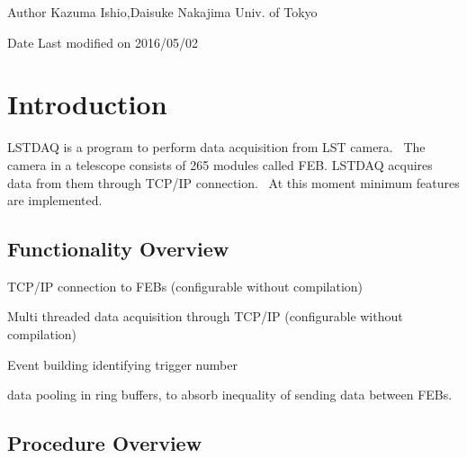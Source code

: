 \begin{DoxyAuthor}{Author}
Kazuma Ishio,Daisuke Nakajima Univ. of Tokyo 
\end{DoxyAuthor}
\begin{DoxyDate}{Date}
Last modified on 2016/05/02
\end{DoxyDate}
\hypertarget{index_INTRO}{}\section{Introduction}\label{index_INTRO}
L\+S\+T\+D\+AQ is a program to perform data acquisition from L\+ST camera.~\newline
 The camera in a telescope consists of 265 modules called F\+EB. L\+S\+T\+D\+AQ acquires data from them through T\+C\+P/\+IP connection.~\newline
 At this moment minimum features are implemented.\hypertarget{index_FUNCTIONALITY_OVERVIEW}{}\subsection{Functionality Overview}\label{index_FUNCTIONALITY_OVERVIEW}

\begin{DoxyItemize}
\item T\+C\+P/\+IP connection to F\+E\+Bs (configurable without compilation)
\item Multi threaded data acquisition through T\+C\+P/\+IP (configurable without compilation)
\item Event building identifying trigger number
\item data pooling in ring buffers, to absorb inequality of sending data between F\+E\+Bs.
\end{DoxyItemize}\hypertarget{index_PROC_OVERVIEW}{}\subsection{Procedure Overview}\label{index_PROC_OVERVIEW}

